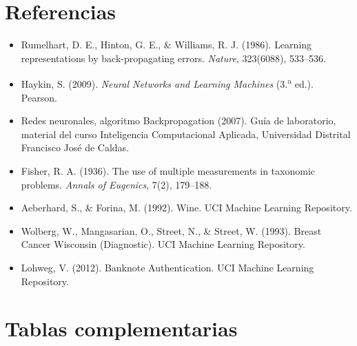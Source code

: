\documentclass[11pt,letterpaper]{article}
\begin{document}
\section{Referencias}
\begin{itemize}
    \item Rumelhart, D. E., Hinton, G. E., \& Williams, R. J. (1986). Learning representations by back-propagating errors. \textit{Nature}, 323(6088), 533--536.
    \item Haykin, S. (2009). \textit{Neural Networks and Learning Machines} (3.\textsuperscript{a} ed.). Pearson.
    \item Redes neuronales, algoritmo Backpropagation (2007). Guía de laboratorio, material del curso Inteligencia Computacional Aplicada, Universidad Distrital Francisco José de Caldas.
    \item Fisher, R. A. (1936). The use of multiple measurements in taxonomic problems. \textit{Annals of Eugenics}, 7(2), 179--188.
    \item Aeberhard, S., \& Forina, M. (1992). Wine. UCI Machine Learning Repository.
    \item Wolberg, W., Mangasarian, O., Street, N., \& Street, W. (1993). Breast Cancer Wisconsin (Diagnostic). UCI Machine Learning Repository.
    \item Lohweg, V. (2012). Banknote Authentication. UCI Machine Learning Repository.
\end{itemize}

\appendix
\section{Tablas complementarias}
\label{anexo:tablas}
\end{document}
